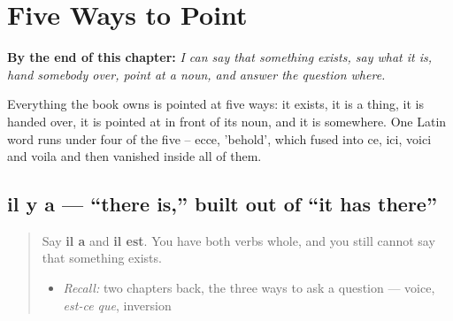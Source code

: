 
\chapter{Five Ways to Point}
\label{ch:fr-pointing}

\begin{chapteropening}
\textbf{By the end of this chapter:} \emph{I can say that something exists, say what it is, hand somebody over, point at a noun, and answer the question where.}

Everything the book owns is pointed at five ways: it exists, it is a thing, it is handed over, it is pointed at in front of its noun, and it is somewhere. One Latin word runs under four of the five -- ecce, 'behold', which fused into ce, ici, voici and voila and then vanished inside all of them.
\end{chapteropening}

\section[il y a]{il y a — \textquotedblleft{}there is,\textquotedblright{} built out of \textquotedblleft{}it has there\textquotedblright{}}

\label{lesson:FR-C34-il-y-a}



\begin{quote}
Say \textbf{il a} and \textbf{il est}. You have both verbs whole, and you still cannot say that something exists.

\begin{itemize}
\raggedright
  \item \emph{Recall:} two chapters back, the three ways to ask a question — voice, \emph{est-ce que}, inversion
\end{itemize}
\end{quote}

